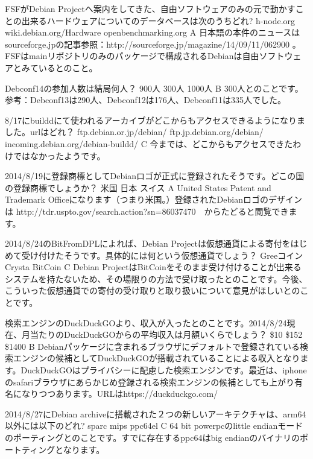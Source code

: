 %

\santaku
{FSFがDebian Projectへ案内をしてきた、自由ソフトウェアのみの元で動かすことの出来るハードウェアについてのデータベースは次のうちどれ?}
{h-node.org}
{wiki.debian.org/Hardware}
{openbenchmarking.org}
{A}
{日本語の本件のニュースはsourceforge.jpの記事参照：http://sourceforge.jp/magazine/14/09/11/062900 。FSFはmainリポジトリのみのパッケージで構成されるDebianは自由ソフトウェアとみているとのこと。}

\santaku
{Debconf14の参加人数は結局何人？}
{900人}
{300人}
{1000人}
{B}
{300人とのことです。参考：Debconf13は290人、Debconf12は176人、Debconf11は335人でした。}

\santaku
{8/17にbuilddにて使われるアーカイブがどこからもアクセスできるようになりました。urlはどれ？}
{ftp.debian.or.jp/debian/}
{ftp.jp.debian.org/debian/}
{incoming.debian.org/debian-buildd/}
{C}
{今までは、どこからもアクセスできたわけではなかったようです。}

\santaku
{2014/8/19に登録商標としてDebianロゴが正式に登録されたそうです。どこの国の登録商標でしょうか？}
{米国}
{日本}
{スイス}
{A}
{United States Patent and Trademark Officeになります（つまり米国。）登録されたDebianロゴのデザインは http://tdr.uspto.gov/search.action?sn=86037470　からたどると閲覧できます。}

\santaku
{2014/8/24のBitFromDPLによれば、Debian Projectは仮想通貨による寄付をはじめて受け付けたそうです。具体的には何という仮想通貨でしょう？}
{Greeコイン}
{Crysta}
{BitCoin}
{C}
{Debian ProjectはBitCoinをそのまま受け付けることが出来るシステムを持たないため、その場限りの方法で受け取ったとのことです。今後、こういった仮想通貨での寄付の受け取りと取り扱いについて意見がほしいとのことです。}

\santaku
{検索エンジンのDuckDuckGOより、収入が入ったとのことです。2014/8/24現在、月当たりのDuckDuckGOからの平均収入は月額いくらでしょう？}
{\$10}
{\$152}
{\$1400}
{B}
{Debianパッケージに含まれるブラウザにデフォルトで登録されている検索エンジンの候補としてDuckDuckGOが搭載されていることによる収入となります。DuckDuckGOはプライバシーに配慮した検索エンジンです。最近は、iphone のsafariブラウザにあらかじめ登録される検索エンジンの候補としても上がり有名になりつつあります。URLはhttps://duckduckgo.com/}

\santaku
{2014/8/27にDebian archiveに搭載された２つの新しいアーキテクチャは、arm64以外には以下のどれ?}
{sparc}
{mips}
{ppc64el}
{C}
{ 64 bit powerpcのlittle endianモードのポーティングとのことです。すでに存在するppc64はbig endianのバイナリのポートティングとなります。}

